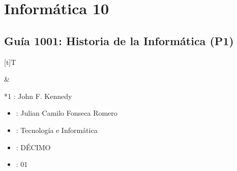 \documentclass[letterpaper,10pt,spanish]{sphinxmanual}
\begin{document}
\sphinxstepscope


\chapter{Informática 10}
\label{\detokenize{1_guias/10informatica/G1000:informatica-10}}\label{\detokenize{1_guias/10informatica/G1000::doc}}
\sphinxstepscope


\section{Guía 1001: Historia de la Informática (P1)}
\label{\detokenize{1_guias/10informatica/G1001:guia-1001-historia-de-la-informatica-p1}}\label{\detokenize{1_guias/10informatica/G1001::doc}}

\begin{savenotes}\sphinxattablestart
\sphinxthistablewithglobalstyle
\centering
\begin{tabular}[t]{}
\sphinxtoprule
\sphinxtableatstartofbodyhook

\begin{savenotes}\sphinxattablestart
\sphinxthistablewithglobalstyle
\centering
\begin{tabulary}{\linewidth}[t]{T}
\sphinxtoprule
\sphinxtableatstartofbodyhook
\sphinxAtStartPar
{}
\\
\sphinxbottomrule
\end{tabulary}
\sphinxtableafterendhook\par
\sphinxattableend\end{savenotes}
&

\begin{savenotes}\sphinxattablestart
\sphinxthistablewithglobalstyle
\raggedright
\begin{tabular}[t]{*{1}{}}
\sphinxtoprule
\sphinxtableatstartofbodyhook
\sphinxAtStartPar
{}: John F. Kennedy
\begin{itemize}
\item {} 
\sphinxAtStartPar
{}: Julian Camilo Fonseca Romero

\item {} 
\sphinxAtStartPar
{}: Tecnología e Informática

\item {} 
\sphinxAtStartPar
{}: DÉCIMO

\item {} 
\sphinxAtStartPar
{}: 01


\end{itemize}
\end{tabular}
\end{savenotes}
\end{tabular}
\end{savenotes}
\end{document}
